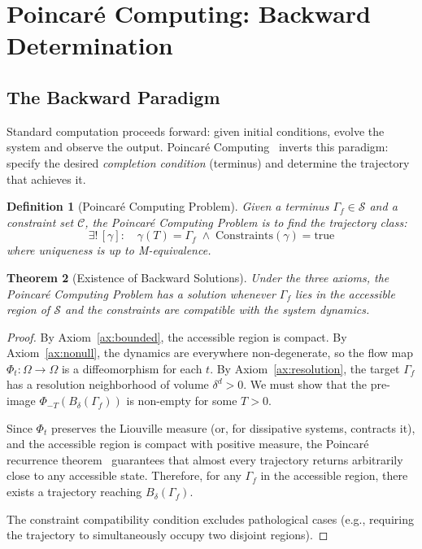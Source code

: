\documentclass[10pt,twocolumn]{article}
\newtheorem{theorem}{Theorem}[section]
\newtheorem{definition}[theorem]{Definition}
\theoremstyle{remark}
\newcommand{\Sspace}{\mathcal{S}}
\newcommand{\Gstate}{\Gamma}
\begin{document}
\section{Poincar\'{e} Computing: Backward Determination}
\label{sec:poincare}

\subsection{The Backward Paradigm}

Standard computation proceeds forward: given initial conditions, evolve the system and observe the output. Poincar\'{e} Computing~\cite{poincare1890probleme,poincare1892methodes} inverts this paradigm: specify the desired \emph{completion condition} (terminus) and determine the trajectory that achieves it.

\begin{definition}[Poincar\'{e} Computing Problem]
\label{def:poincare}
Given a terminus $\Gstate_f \in \Sspace$ and a constraint set $\mathcal{C}$, the Poincar\'{e} Computing Problem is to find the trajectory class:
\begin{equation}
\exists!\,[\gamma]: \quad \gamma(T) = \Gstate_f \;\wedge\; \text{Constraints}(\gamma) = \text{true}
\label{eq:poincare}
\end{equation}
where uniqueness is up to M-equivalence.
\end{definition}

\begin{theorem}[Existence of Backward Solutions]
\label{thm:backward}
Under the three axioms, the Poincar\'{e} Computing Problem has a solution whenever $\Gstate_f$ lies in the accessible region of $\Sspace$ and the constraints are compatible with the system dynamics.
\end{theorem}

\begin{proof}
By Axiom~\ref{ax:bounded}, the accessible region is compact. By Axiom~\ref{ax:nonull}, the dynamics are everywhere non-degenerate, so the flow map $\Phi_t: \Omega \to \Omega$ is a diffeomorphism for each $t$. By Axiom~\ref{ax:resolution}, the target $\Gstate_f$ has a resolution neighborhood of volume $\delta^d > 0$. We must show that the pre-image $\Phi_{-T}(B_\delta(\Gstate_f))$ is non-empty for some $T > 0$.

Since $\Phi_t$ preserves the Liouville measure (or, for dissipative systems, contracts it), and the accessible region is compact with positive measure, the Poincar\'{e} recurrence theorem~\cite{poincare1890probleme,arnold1989mathematical} guarantees that almost every trajectory returns arbitrarily close to any accessible state. Therefore, for any $\Gstate_f$ in the accessible region, there exists a trajectory reaching $B_\delta(\Gstate_f)$.

The constraint compatibility condition excludes pathological cases (e.g., requiring the trajectory to simultaneously occupy two disjoint regions).
\end{proof}
\end{document}
